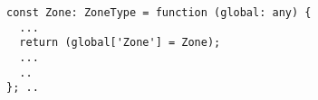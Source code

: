\begin{verbatim}
const Zone: ZoneType = function (global: any) {
  ...
  return (global['Zone'] = Zone);
  ...
  ..
}; ..
\end{verbatim}

